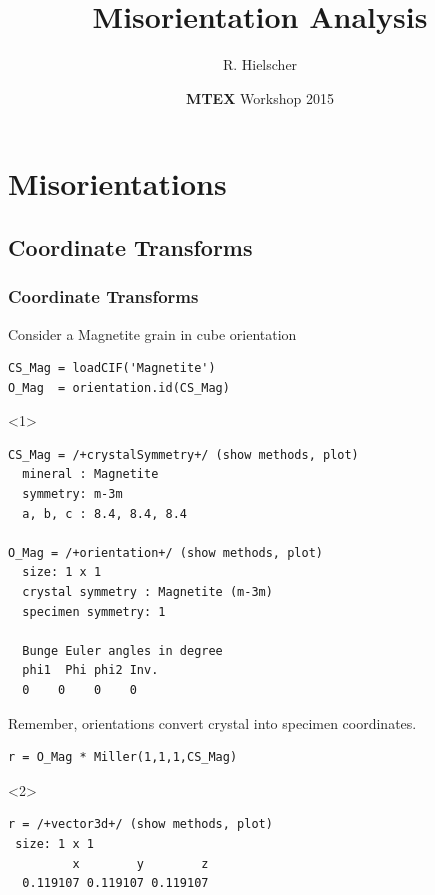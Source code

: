 \documentclass[compress]{beamer}
\author{R. Hielscher}
\title{Misorientation Analysis}
\institute{Faculty of Mathematics,\\
	Chemnitz University of Technology, Germany}
\date{{\bf{\color{red}M}TEX} Workshop 2015}
\begin{document}
\begin{frame}
  \maketitle{}
\end{frame}


\section{Misorientations}


\subsection*{Coordinate Transforms}
\label{sec:orientations}


\begin{frame}[fragile]
  \frametitle{Coordinate Transforms}

  \begin{overlayarea}{\textwidth}{8cm}

    Consider a Magnetite grain in cube orientation
    \vspace{-0.2cm}
    \begin{lstlisting}[style=input]
CS_Mag = loadCIF('Magnetite')
O_Mag  = orientation.id(CS_Mag)
   \end{lstlisting}
   \begin{onlyenv}<1>
     \vspace{-0.3cm}
     \begin{lstlisting}[style=output]
CS_Mag = /+crystalSymmetry+/ (show methods, plot)
  mineral : Magnetite
  symmetry: m-3m
  a, b, c : 8.4, 8.4, 8.4

O_Mag = /+orientation+/ (show methods, plot)
  size: 1 x 1
  crystal symmetry : Magnetite (m-3m)
  specimen symmetry: 1

  Bunge Euler angles in degree
  phi1  Phi phi2 Inv.
  0    0    0    0
    \end{lstlisting}
  \end{onlyenv}

  \pause

  Remember, orientations convert crystal into specimen
  coordinates.
  \vspace{-.2cm}
  \begin{lstlisting}[style=input]
r = O_Mag * Miller(1,1,1,CS_Mag)
\end{lstlisting}
  \begin{onlyenv}<2>
\vspace{-.3cm}\begin{lstlisting}[style=output]
r = /+vector3d+/ (show methods, plot)
 size: 1 x 1
         x        y        z
  0.119107 0.119107 0.119107
\end{lstlisting}
  \end{onlyenv}


\end{overlayarea}
\end{frame}
\end{document}
